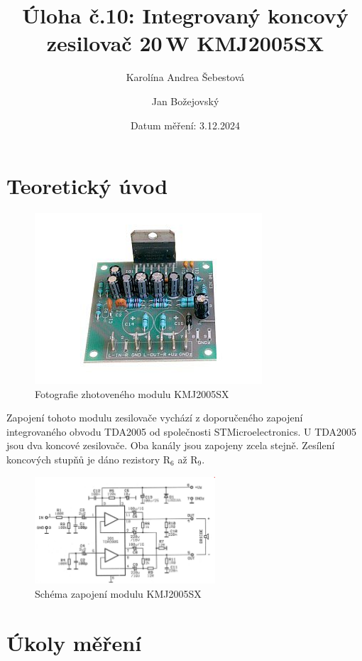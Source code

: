 \documentclass[a4paper, czech]{article}
\title{Úloha č.10: Integrovaný koncový zesilovač 20\,W KMJ2005SX}
\author{Karolína Andrea Šebestová \and Jan Božejovský}
\date{Datum měření: 3.12.2024}
\begin{document}
\maketitle

\section{Teoretický úvod}

\begin{figure}[H]
    \centering
    \includegraphics[]{kmj2005.jpg}
    \caption{Fotografie zhotoveného modulu KMJ2005SX}
\end{figure}

Zapojení tohoto modulu zesilovače vychází z doporučeného zapojení integrovaného
obvodu TDA2005 od společnosti STMicroelectronics.
U TDA2005 jsou dva koncové zesilovače.
Oba kanály jsou zapojeny zcela stejně.
Zesílení koncových stupňů je dáno rezistory R$_6$ až R$_9$.

\begin{figure}[H]
    \centering
    \includegraphics[width=0.6\textwidth]{schema.png}
    \caption{Schéma zapojení modulu KMJ2005SX}
\end{figure}

\pagebreak

\section{Úkoly měření}
\end{document}
